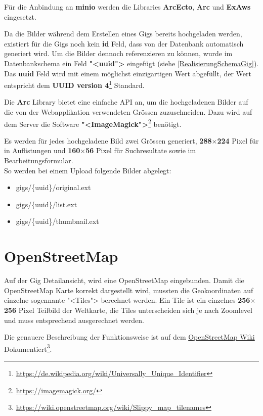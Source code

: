 Für die Anbindung an \textbf{minio} werden die Libraries \textbf{ArcEcto}, \textbf{Arc} und \textbf{ExAws} eingesetzt.

Da die Bilder während dem Erstellen eines Gigs bereits hochgeladen werden, existiert für die Gigs
noch kein \textbf{id} Feld, dass von der Datenbank automatisch generiert wird.
Um die Bilder dennoch referenzieren zu können, wurde im Datenbankschema ein
Feld \textbf{"<uuid">} eingefügt (siehe \ref{RealisierungSchemaGig}).
Das \textbf{uuid} Feld wird mit einem möglichst einzigartigen Wert abgefüllt,
der Wert entspricht dem \textbf{UUID version 4}\footnote{\url{https://de.wikipedia.org/wiki/Universally_Unique_Identifier}} Standard.

Die \textbf{Arc} Library bietet eine einfache API an, um die hochgeladenen Bilder
auf die von der Webapplikation verwendeten Grössen zuzuschneiden. Dazu wird auf dem
Server die Software \textbf{"<ImageMagick">}\footnote{\url{https://imagemagick.org/}}
benötigt.

Es werden für jedes hochgeladene Bild zwei Grössen generiert,
\textbf{288$\times$224} Pixel für in Auflistungen und \textbf{160$\times$56}
Pixel für Suchresultate sowie im Bearbeitungsformular.\\

\noindent{}So werden bei einem Upload folgende Bilder abgelegt:
\begin{itemize}
  \tightlist{}
  \item{} gigs/\{uuid\}/original.ext
  \item{} gigs/\{uuid\}/list.ext
  \item{} gigs/\{uuid\}/thumbnail.ext
\end{itemize}

\section{OpenStreetMap}

Auf der Gig Detailansicht, wird eine OpenStreetMap eingebunden. Damit
die OpenStreetMap Karte korrekt dargestellt wird, mussten die Geokoordinaten
auf einzelne sogennante "<Tiles"> berechnet werden. Ein Tile ist ein einzelnes
\textbf{256$\times$256} Pixel Teilbild der Weltkarte, die Tiles unterscheiden
sich je nach Zoomlevel und muss entsprechend ausgerechnet werden.

Die genauere Beschreibung der Funktionsweise ist auf dem
\href{https://wiki.openstreetmap.org/wiki/Slippy\_map\_tilenames}{OpenStreetMap Wiki}
Dokumentiert\footnote{\url{https://wiki.openstreetmap.org/wiki/Slippy\_map\_tilenames}}.

